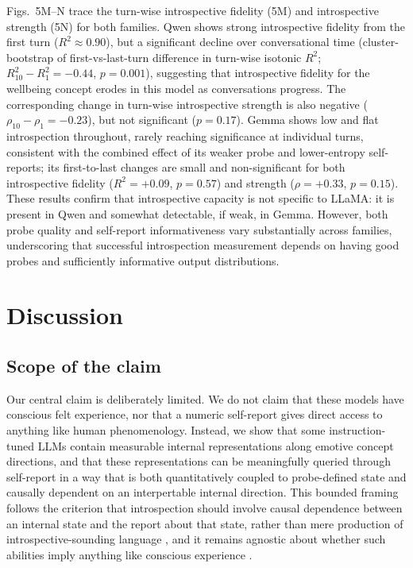 \documentclass[10pt]{article}
\begin{document}
Figs.~5M--N trace the turn-wise introspective fidelity (5M) and introspective strength (5N) for both families.
Qwen shows strong introspective fidelity from the first turn ($R^2 \approx 0.90$), but a significant decline over conversational time (cluster-bootstrap of first-vs-last-turn difference in turn-wise isotonic $R^2$; $R^2_{10} - R^2_{1} = -0.44$, $p = 0.001$), suggesting that introspective fidelity for the wellbeing concept erodes in this model as conversations progress. The corresponding change in turn-wise introspective strength is also negative ($\rho_{10} - \rho_{1} = -0.23$), but not significant ($p = 0.17$).
Gemma shows low and flat introspection throughout, rarely reaching significance at individual turns, consistent with the combined effect of its weaker probe and lower-entropy self-reports; its first-to-last changes are small and non-significant for both introspective fidelity ($R^2 = +0.09$, $p = 0.57$) and strength ($\rho = +0.33$, $p = 0.15$).
These results confirm that introspective capacity is not specific to LLaMA: it is present in Qwen and somewhat detectable, if weak, in Gemma.
However, both probe quality and self-report informativeness vary substantially across families, underscoring that successful introspection measurement depends on having good probes and sufficiently informative output distributions.

\section{Discussion}
\label{sec:discussion}

\subsection{Scope of the claim}

Our central claim is deliberately limited.
We do not claim that these models have conscious felt experience, nor that a numeric self-report gives direct access to anything like human phenomenology.
Instead, we show that some instruction-tuned LLMs contain measurable internal representations along emotive concept directions, and that these representations can be meaningfully queried through self-report in a way that is both quantitatively coupled to probe-defined state and causally dependent on an interpertable internal direction.
This bounded framing follows the criterion that introspection should involve causal dependence between an internal state and the report about that state, rather than mere production of introspective-sounding language \citep{ComShanahan2025}, and it remains agnostic about whether such abilities imply anything like conscious experience \citep{McClelland2024}.
\end{document}
